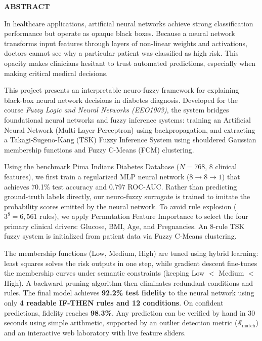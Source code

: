 \documentclass{report}
\begin{document}
\clearpage
{}
\begin{center}
    \vspace*{0.1cm}
    {\fontsize{15}{18}\selectfont \bfseries ABSTRACT}\\[0.35cm]
\end{center}

\noindent
In healthcare applications, artificial neural networks achieve strong classification performance but operate as opaque black boxes. Because a neural network transforms input features through layers of non-linear weights and activations, doctors cannot see why a particular patient was classified as high risk. This opacity makes clinicians hesitant to trust automated predictions, especially when making critical medical decisions.

This project presents an interpretable neuro-fuzzy framework for explaining black-box neural network decisions in diabetes diagnosis. Developed for the course \textit{Fuzzy Logic and Neural Networks (EEO1003)}, the system bridges foundational neural networks and fuzzy inference systems: training an Artificial Neural Network (Multi-Layer Perceptron) using backpropagation, and extracting a Takagi-Sugeno-Kang (TSK) Fuzzy Inference System using shouldered Gaussian membership functions and Fuzzy C-Means (FCM) clustering.

Using the benchmark Pima Indians Diabetes Database ($N=768$, 8 clinical features), we first train a regularized MLP neural network ($8 \to 8 \to 1$) that achieves 70.1\% test accuracy and 0.797 ROC-AUC. Rather than predicting ground-truth labels directly, our neuro-fuzzy surrogate is trained to imitate the probability scores emitted by the neural network. To avoid rule explosion ($3^8 = 6{,}561$ rules), we apply Permutation Feature Importance to select the four primary clinical drivers: Glucose, BMI, Age, and Pregnancies. An 8-rule TSK fuzzy system is initialized from patient data via Fuzzy C-Means clustering.

The membership functions (Low, Medium, High) are tuned using hybrid learning: least squares solves the risk outputs in one step, while gradient descent fine-tunes the membership curves under semantic constraints (keeping Low $<$ Medium $<$ High). A backward pruning algorithm then eliminates redundant conditions and rules. The final model achieves \textbf{92.2\% test fidelity} to the neural network using only \textbf{4 readable IF-THEN rules and 12 conditions}. On confident predictions, fidelity reaches \textbf{98.3\%}. Any prediction can be verified by hand in 30 seconds using simple arithmetic, supported by an outlier detection metric ($\mathcal{S}_{\text{match}}$) and an interactive web laboratory with live feature sliders.
\end{document}
